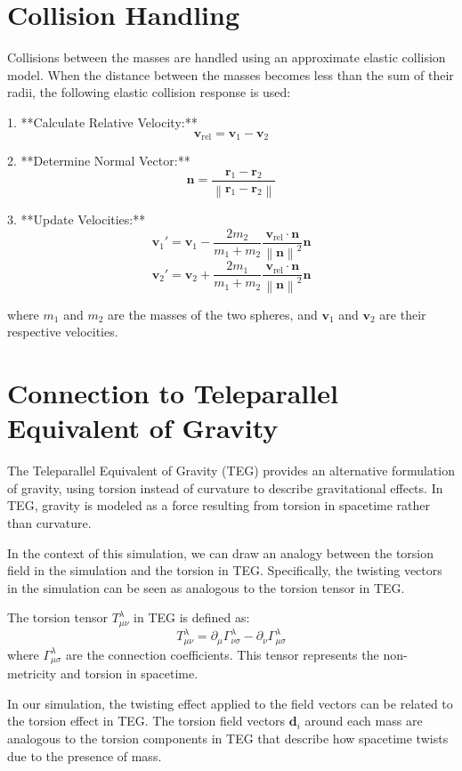\documentclass{article}
\begin{document}
\section{Collision Handling}
Collisions between the masses are handled using an approximate elastic collision model. When the distance between the masses becomes less than the sum of their radii, the following elastic collision response is used:

1. **Calculate Relative Velocity:**
\[
\mathbf{v}_{\text{rel}} = \mathbf{v}_1 - \mathbf{v}_2
\]

2. **Determine Normal Vector:**
\[
\mathbf{n} = \frac{\mathbf{r}_1 - \mathbf{r}_2}{\left\| \mathbf{r}_1 - \mathbf{r}_2 \right\|}
\]

3. **Update Velocities:**
\[
\mathbf{v}_1' = \mathbf{v}_1 - \frac{2 m_2}{m_1 + m_2} \frac{\mathbf{v}_{\text{rel}} \cdot \mathbf{n}}{ \left\| \mathbf{n} \right\|^2 } \mathbf{n}
\]
\[
\mathbf{v}_2' = \mathbf{v}_2 + \frac{2 m_1}{m_1 + m_2} \frac{\mathbf{v}_{\text{rel}} \cdot \mathbf{n}}{ \left\| \mathbf{n} \right\|^2 } \mathbf{n}
\]

where $m_1$ and $m_2$ are the masses of the two spheres, and $\mathbf{v}_1$ and $\mathbf{v}_2$ are their respective velocities.

\section{Connection to Teleparallel Equivalent of Gravity}
The Teleparallel Equivalent of Gravity (TEG) provides an alternative formulation of gravity, using torsion instead of curvature to describe gravitational effects. In TEG, gravity is modeled as a force resulting from torsion in spacetime rather than curvature.

In the context of this simulation, we can draw an analogy between the torsion field in the simulation and the torsion in TEG. Specifically, the twisting vectors in the simulation can be seen as analogous to the torsion tensor in TEG.

The torsion tensor $T^\lambda_{\mu\nu}$ in TEG is defined as:
\[
T^\lambda_{\mu\nu} = \partial_\mu \Gamma^\lambda_{\nu\sigma} - \partial_\nu \Gamma^\lambda_{\mu\sigma}
\]
where $\Gamma^\lambda_{\mu\sigma}$ are the connection coefficients. This tensor represents the non-metricity and torsion in spacetime.

In our simulation, the twisting effect applied to the field vectors can be related to the torsion effect in TEG. The torsion field vectors $\mathbf{d}_i$ around each mass are analogous to the torsion components in TEG that describe how spacetime twists due to the presence of mass.
\end{document}
